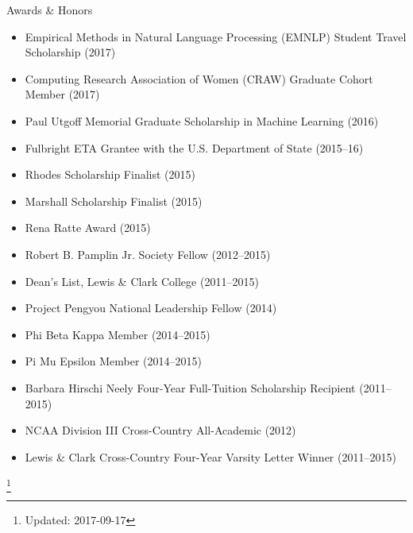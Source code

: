 \documentclass{resume} %
\newcommand\blfootnote[1]{%
  \begingroup
  \renewcommand\thefootnote{}\footnote{#1}%
  \addtocounter{footnote}{-1}%
  \endgroup
}
\begin{document}

\begin{rSection}{Awards \& Honors}
\begin{itemize}
\item Empirical Methods in Natural Language Processing (EMNLP) Student Travel Scholarship (2017)
\item Computing Research Association of Women (CRAW) Graduate Cohort Member (2017) 
\item Paul Utgoff Memorial Graduate Scholarship in Machine Learning (2016) 
\item Fulbright ETA Grantee with the U.S. Department of State (2015--16)
\item Rhodes Scholarship Finalist (2015) 
\item Marshall Scholarship Finalist (2015) 
\item Rena Ratte Award (2015) 
\item Robert B. Pamplin Jr. Society Fellow (2012--2015)
\item Dean's List, Lewis \& Clark College (2011--2015)
\item Project Pengyou National Leadership Fellow (2014) 
\item Phi Beta Kappa Member (2014--2015)
\item Pi Mu Epsilon Member (2014--2015)
\item Barbara Hirschi Neely Four-Year Full-Tuition Scholarship Recipient (2011--2015)
\item NCAA Division III Cross-Country All-Academic (2012) 
\item Lewis \& Clark Cross-Country Four-Year Varsity Letter Winner (2011--2015)
\end{itemize} 

\end{rSection}

\blfootnote{Updated: 2017-09-17}

\bigskip
\end{document}
